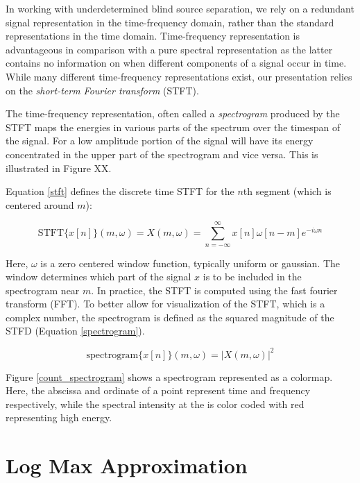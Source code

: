 \documentclass[11pt, oneside, a4paper]{report}
\begin{document}
In working with underdetermined blind source separation, we
rely on a redundant signal representation in the time-frequency
domain, rather than the standard representations in the time
domain. Time-frequency representation is advantageous in comparison with a
pure spectral representation as the latter contains no information on
when different components of a signal occur in time. While many
different time-frequency representations exist, our presentation
relies on the \emph{short-term Fourier transform} (STFT).

The time-frequency representation, often called a \emph{spectrogram} produced by the STFT maps the
energies in various parts of the spectrum over the timespan of the
signal. For a low amplitude portion of the signal will have its energy
concentrated in the upper part of the spectrogram and vice versa. This
is illustrated in Figure XX.

Equation \ref{stft} defines the discrete time STFT for the $n$th
segment (which is centered around $m$):

\begin{equation}\label{stft}
  \text{STFT}\{x[n]\}(m,\omega)= X(m,\omega) =\sum_{n = -\infty}^{\infty}
  x[n]\omega[n-m]e^{-i\omega n}
\end{equation}

Here, $\omega$ is a zero centered window function, typically uniform
or gaussian. The window determines which part of the signal $x$ is to
be included in the spectrogram near $m$. In practice, the STFT is
computed using the fast fourier transform (FFT). To better allow for
visualization of the STFT, which is a complex number, the spectrogram
is defined as the squared magnitude of the STFD (Equation \ref{spectrogram}).

\begin{equation}\label{spectrogram}
  \text{spectrogram}\{x[n]\}(m,\omega) = |X(m,\omega)|^2 
\end{equation}

Figure \ref{count_spectrogram} shows a spectrogram represented as a colormap. Here, the abscissa and
ordinate of a point represent time and frequency respectively, while the spectral intensity at the is
color coded with red representing high energy.


\section{Log Max Approximation}\label{logmaxapprox}
\end{document}

